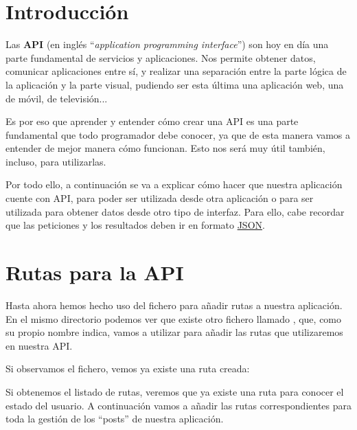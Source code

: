 \chapter{Introducción}

Las \textbf{API} (en inglés “\textit{application programming interface}”) son hoy en día una parte fundamental de servicios y aplicaciones. Nos permite obtener datos, comunicar aplicaciones entre sí, y realizar una separación entre la parte lógica de la aplicación y la parte visual, pudiendo ser esta última una aplicación web, una de móvil, de televisión...

Es por eso que aprender y entender cómo crear una API es una parte fundamental que todo programador debe conocer, ya que de esta manera vamos a entender de mejor manera cómo funcionan. Esto nos será muy útil también, incluso, para utilizarlas.

Por todo ello, a continuación se va a explicar cómo hacer que nuestra aplicación cuente con API, para poder ser utilizada desde otra aplicación o para ser utilizada para obtener datos desde otro tipo de interfaz. Para ello, cabe recordar que las peticiones y los resultados deben ir en formato \href{https://es.wikipedia.org/wiki/JSON}{JSON}.


\chapter{Rutas para la API}

Hasta ahora hemos hecho uso del fichero  para añadir rutas a nuestra aplicación. En el mismo directorio podemos ver que existe otro fichero llamado , que, como su propio nombre indica, vamos a utilizar para añadir las rutas que utilizaremos en nuestra API.

Si observamos el fichero, vemos ya existe una ruta creada:


Si obtenemos el listado de rutas, veremos que ya existe una ruta para conocer el estado del usuario. A continuación vamos a añadir las rutas correspondientes para toda la gestión de los “posts” de nuestra aplicación.

